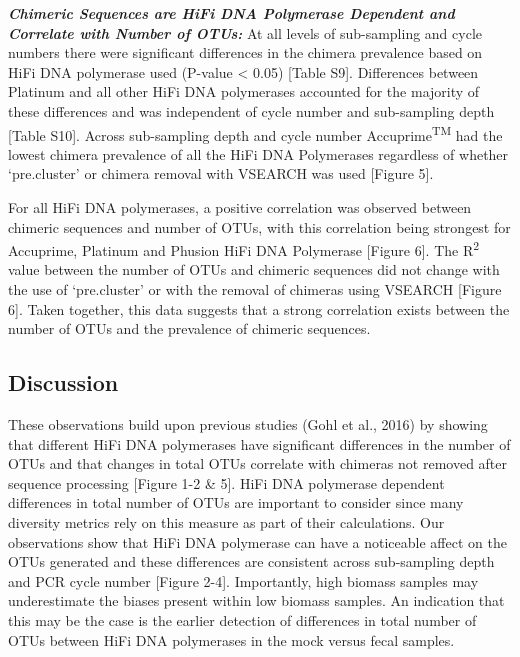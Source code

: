 \documentclass[12pt,]{article}
\begin{document}
\textbf{\emph{Chimeric Sequences are HiFi DNA Polymerase Dependent and
Correlate with Number of OTUs:}} At all levels of sub-sampling and cycle
numbers there were significant differences in the chimera prevalence
based on HiFi DNA polymerase used (P-value \textless{} 0.05) {[}Table
S9{]}. Differences between Platinum and all other HiFi DNA polymerases
accounted for the majority of these differences and was independent of
cycle number and sub-sampling depth {[}Table S10{]}. Across sub-sampling
depth and cycle number Accuprime\textsuperscript{TM} had the lowest
chimera prevalence of all the HiFi DNA Polymerases regardless of whether
`pre.cluster' or chimera removal with VSEARCH was used {[}Figure 5{]}.

For all HiFi DNA polymerases, a positive correlation was observed
between chimeric sequences and number of OTUs, with this correlation
being strongest for Accuprime, Platinum and Phusion HiFi DNA Polymerase
{[}Figure 6{]}. The R\textsuperscript{2} value between the number of
OTUs and chimeric sequences did not change with the use of `pre.cluster'
or with the removal of chimeras using VSEARCH {[}Figure 6{]}. Taken
together, this data suggests that a strong correlation exists between
the number of OTUs and the prevalence of chimeric sequences.

\newpage

\subsection{Discussion}\label{discussion}

These observations build upon previous studies (Gohl et al., 2016) by
showing that different HiFi DNA polymerases have significant differences
in the number of OTUs and that changes in total OTUs correlate with
chimeras not removed after sequence processing {[}Figure 1-2 \& 5{]}.
HiFi DNA polymerase dependent differences in total number of OTUs are
important to consider since many diversity metrics rely on this measure
as part of their calculations. Our observations show that HiFi DNA
polymerase can have a noticeable affect on the OTUs generated and these
differences are consistent across sub-sampling depth and PCR cycle
number {[}Figure 2-4{]}. Importantly, high biomass samples may
underestimate the biases present within low biomass samples. An
indication that this may be the case is the earlier detection of
differences in total number of OTUs between HiFi DNA polymerases in the
mock versus fecal samples.
\end{document}
